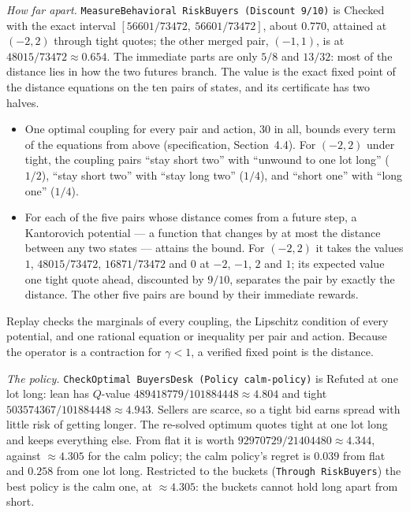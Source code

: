 \documentclass[11pt]{article}
\newcommand{\code}[1]{\texttt{#1}}
\newcommand{\spec}[1]{specification, Section~#1}
\theoremstyle{definition}
\theoremstyle{plain}
\begin{document}
\emph{How far apart.} \code{MeasureBehavioral RiskBuyers (Discount 9/10)} is Checked with the exact
interval $[56601/73472,\ 56601/73472]$, about $0.770$, attained at $(-2,2)$ through tight quotes; the
other merged pair, $(-1,1)$, is at $48015/73472\approx0.654$. The immediate parts are only $5/8$ and
$13/32$: most of the distance lies in how the two futures branch. The value is the exact fixed point of
the distance equations on the ten pairs of states, and its certificate has two halves.
\begin{itemize}
\item One optimal coupling for every pair and action, $30$ in all, bounds every term of the equations
from above (\spec{4.4}). For $(-2,2)$ under tight, the coupling pairs ``stay short two'' with
``unwound to one lot long'' ($1/2$), ``stay short two'' with ``stay long two'' ($1/4$), and ``short one''
with ``long one'' ($1/4$).
\item For each of the five pairs whose distance comes from a future step, a Kantorovich potential
--- a function that changes by at most the distance between any two states --- attains the bound.
For $(-2,2)$ it takes the values $1$, $48015/73472$, $16871/73472$ and $0$ at $-2$, $-1$, $2$ and $1$;
its expected value one tight quote ahead, discounted by $9/10$, separates the pair by exactly the
distance. The other five pairs are bound by their immediate rewards.
\end{itemize}
Replay checks the marginals of every coupling, the Lipschitz condition of every potential, and one
rational equation or inequality per pair and action. Because the operator is a contraction for
$\gamma<1$, a verified fixed point is the distance.

\emph{The policy.} \code{CheckOptimal BuyersDesk (Policy calm-policy)} is Refuted at one lot long:
lean has $Q$-value $489418779/101884448\approx4.804$ and tight $503574367/101884448\approx4.943$.
Sellers are scarce, so a tight bid earns spread with little risk of getting longer. The re-solved
optimum quotes tight at one lot long and keeps everything else. From flat it is worth
$92970729/21404480\approx4.344$, against $\approx4.305$ for the calm policy; the calm policy's regret is
$0.039$ from flat and $0.258$ from one lot long. Restricted to the buckets (\code{Through RiskBuyers})
the best policy is the calm one, at $\approx4.305$: the buckets cannot hold long apart from short.
\end{document}
